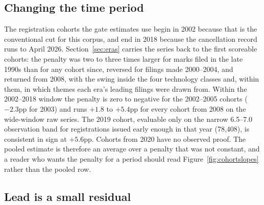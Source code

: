\subsection{Changing the time period}\label{sec:robust_periods}

The registration cohorts the gate estimates use begin in 2002 because that
is the conventional cut for this corpus, and end in 2018 because the
cancellation record runs to April 2026. Section~\ref{sec:eras} carries the
series back to the first scoreable cohorts: the penalty was two to three
times larger for marks filed in the late 1990s than for any cohort since,
reversed for filings made 2000--2004, and returned from 2008, with the swing
inside the four technology classes and, within them, in which themes each
era's leading filings were drawn from. Within the 2002--2018 window the
penalty is zero to negative for the 2002--2005 cohorts ($-2.3$pp for 2003)
and runs $+1.8$ to $+5.4$pp for every cohort from 2008 on the wide-window
raw series. The 2019 cohort, evaluable only on the narrow 6.5--7.0
observation band for registrations issued early enough in that year
(78{,}408), is consistent in sign at $+5.6$pp. Cohorts from 2020 have no
observed proof. The pooled estimate is therefore an average over a penalty
that was not constant, and a reader who wants the penalty for a period
should read Figure~\ref{fig:cohortslopes} rather than the pooled row.

\subsection{Lead is a small residual}

